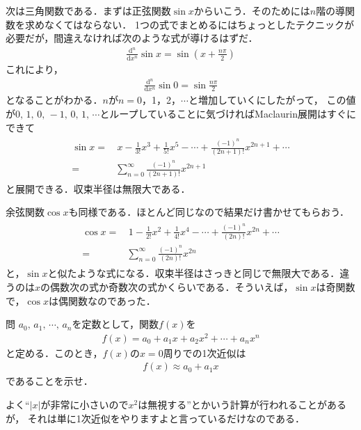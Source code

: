 次は三角関数である．まずは正弦関数$\sin x$からいこう．そのためには$n$階の導関数を求めなくてはならない．
1つの式でまとめるにはちょっとしたテクニックが必要だが，間違えなければ次のような式が導けるはずだ．
\begin{align*}
\frac{\mathrm{d}^n}{\mathrm{d}x^n} \sin x = \sin \left( x + \frac{n \pi}{2} \right)
\end{align*}
これにより，
\begin{align*}
\frac{\mathrm{d}^n}{\mathrm{d}x^n} \sin 0 = \sin \frac{n \pi}{2}
\end{align*}
となることがわかる．$n$が$n =$0，1，2，$\cdots$と増加していくにしたがって，
この値が$0, \, 1, \, 0, \, -1, \, 0, \, 1, \, \cdots$とループしていることに気づければMaclaurin展開はすぐにできて
\begin{align}
\begin{aligned}
\sin x = & \, x - \frac{1}{3!}x^3 + \frac{1}{5!}x^5 - \cdots +\frac{ (-1)^n}{(2n+1)!} x^{2n+1} + \cdots \\
= & \sum_{n=0}^{\infty} \frac{(-1)^n}{(2n+1)!} x^{2n+1}
\label{eq:seigenn}
\end{aligned}
\end{align}
と展開できる．収束半径は無限大である．

余弦関数$\cos x$も同様である．ほとんど同じなので結果だけ書かせてもらおう．
\begin{align}
\begin{aligned}
\cos x = & \, 1- \frac{1}{2!} x^2 + \frac{1}{4!} x^4 - \cdots + \frac{(-1)^n}{(2n)!} x^{2n} + \cdots \\
= & \sum_{n=0}^{\infty} \frac{(-1)^n}{(2n)!} x^{2n}
\label{eq:yogenn}
\end{aligned}
\end{align}
と，$\sin x$と似たような式になる．収束半径はさっきと同じで無限大である．違うのは$x$の偶数次の式か奇数次の式かくらいである．そういえば，$\sin x$は奇関数で，$\cos x$は偶関数なのであった．

\begin{itembox}[l]{問}
$a_0, \, a_1, \, \cdots , \, a_n$を定数として，関数$f(x)$を
\begin{align*}
f(x) = a_0 + a_1 x + a_2 x^2 + \cdots + a_n x^n
\end{align*}
と定める．このとき，$f(x)$の$x=0$周りでの1次近似は
\begin{align*}
f(x) \approx a_0 + a_1 x
\end{align*}
であることを示せ．
\end{itembox}

よく``$\lvert x \rvert$が非常に小さいので$x^2$は無視する''とかいう計算が行われることがあるが，
それは単に1次近似をやりますよと言っているだけなのである．
